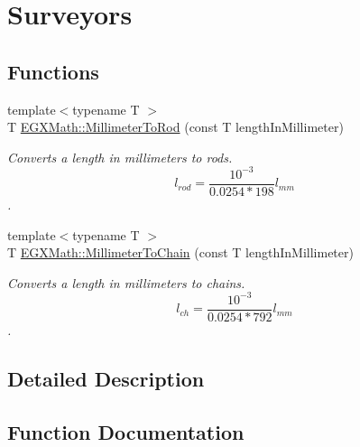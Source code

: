 \hypertarget{group___e_g_x_math-_conversions-_length_conversions-_s_i-_millimeter-_surveyors}{}\section{Surveyors}
\label{group___e_g_x_math-_conversions-_length_conversions-_s_i-_millimeter-_surveyors}
\subsection*{Functions}
\begin{DoxyCompactItemize}
\item 
{\footnotesize template$<$typename T $>$ }\\T \mbox{\hyperlink{group___e_g_x_math-_conversions-_length_conversions-_s_i-_millimeter-_surveyors_ga658a03332f16e17bdd23bd770091b221}{E\+G\+X\+Math\+::\+Millimeter\+To\+Rod}} (const T length\+In\+Millimeter)
\begin{DoxyCompactList}\small\item\em Converts a length in millimeters to rods. \[ l_{rod}= \frac{10^{-3}}{0.0254 * 198} l_{mm} \]. \end{DoxyCompactList}\item 
{\footnotesize template$<$typename T $>$ }\\T \mbox{\hyperlink{group___e_g_x_math-_conversions-_length_conversions-_s_i-_millimeter-_surveyors_gaacdbed15976b36734f17c99e024d96cd}{E\+G\+X\+Math\+::\+Millimeter\+To\+Chain}} (const T length\+In\+Millimeter)
\begin{DoxyCompactList}\small\item\em Converts a length in millimeters to chains. \[ l_{ch}= \frac{10^{-3}}{0.0254 * 792} l_{mm} \]. \end{DoxyCompactList}\end{DoxyCompactItemize}


\subsection{Detailed Description}


\subsection{Function Documentation}
\mbox{\label{group___e_g_x_math-_conversions-_length_conversions-_s_i-_millimeter-_surveyors_gaacdbed15976b36734f17c99e024d96cd}} 
